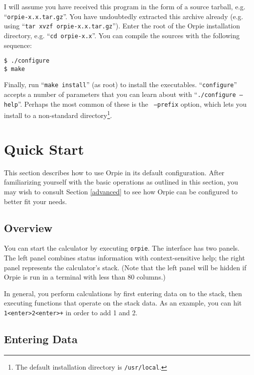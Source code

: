 \documentclass[11pt,notitlepage]{article}
\begin{document}
I will assume you have received this program in the form of a source tarball, 
e.g. ``{\tt orpie-x.x.tar.gz}''.  You have undoubtedly extracted this archive 
already (e.g. using ``{\tt tar xvzf orpie-x.x.tar.gz}'').  Enter the root of 
the Orpie installation directory, e.g. ``{\tt cd orpie-x.x}''.  You can compile
the sources with the following sequence:
\begin{verbatim}
$ ./configure
$ make
\end{verbatim}
Finally, run ``{\tt make install}'' (as root) to install the executables.
``{\tt configure}'' accepts a number of parameters that you can learn about with
``{\tt ./configure --help}''.  Perhaps the most common of these is the {\tt
--prefix} option, which lets you install to a non-standard
directory\footnote{The default installation directory is {\tt /usr/local}.}.  


\section{Quick Start}
This section describes how to use Orpie in its default configuration.  After
familiarizing yourself with the basic operations as outlined in this section,
you may wish to consult Section \ref{advanced} to see how Orpie can be
configured to better fit your needs.

\subsection{Overview}
You can start the calculator by executing {\tt orpie}.  The interface has two
panels.  The left panel combines status information with context-sensitive help;
the right panel represents the calculator's stack.  (Note that the left panel
will be hidden if Orpie is run in a terminal with less than 80 columns.)

In general, you perform calculations by first entering data on to the stack,
then executing functions that operate on the stack data.  As an example, you can
hit {\tt 1<enter>2<enter>+} in order to add 1 and 2.

\subsection{Entering Data}
\end{document}
